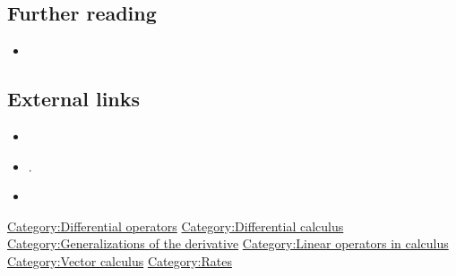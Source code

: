 \documentclass[
]{article}
\begin{document}
\hypertarget{further_reading}{%
\subsection{Further reading}\label{further_reading}}

\begin{itemize}
\item
\end{itemize}

\hypertarget{external_links}{%
\subsection{External links}\label{external_links}}

\begin{itemize}
\item
\item
  .
\item
\end{itemize}

\href{Category:Differential_operators}{Category:Differential operators}
\href{Category:Differential_calculus}{Category:Differential calculus}
\href{Category:Generalizations_of_the_derivative}{Category:Generalizations
of the derivative}
\href{Category:Linear_operators_in_calculus}{Category:Linear operators
in calculus} \href{Category:Vector_calculus}{Category:Vector calculus}
\url{Category:Rates}
\end{document}
